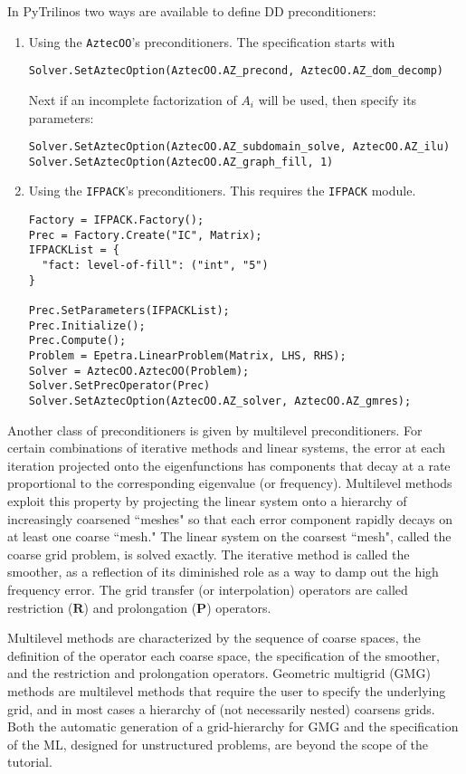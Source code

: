 \documentclass[10pt,relax]{SANDreport}
\begin{document}
In PyTrilinos two ways are available to define DD preconditioners:
\begin{enumerate}
\item Using the {\tt AztecOO}'s preconditioners. The specification starts with
\begin{verbatim}
Solver.SetAztecOption(AztecOO.AZ_precond, AztecOO.AZ_dom_decomp)
\end{verbatim}
Next if an incomplete factorization of $A_i$ will be used, then specify its parameters:
\begin{verbatim}
Solver.SetAztecOption(AztecOO.AZ_subdomain_solve, AztecOO.AZ_ilu)
Solver.SetAztecOption(AztecOO.AZ_graph_fill, 1)
\end{verbatim}

\item Using the {\tt IFPACK}'s preconditioners. This requires the {\tt IFPACK}
module.
\begin{verbatim}
Factory = IFPACK.Factory();
Prec = Factory.Create("IC", Matrix);
IFPACKList = {
  "fact: level-of-fill": ("int", "5")
}

Prec.SetParameters(IFPACKList);
Prec.Initialize();
Prec.Compute();
Problem = Epetra.LinearProblem(Matrix, LHS, RHS);
Solver = AztecOO.AztecOO(Problem);
Solver.SetPrecOperator(Prec)
Solver.SetAztecOption(AztecOO.AZ_solver, AztecOO.AZ_gmres);
\end{verbatim}
\end{enumerate}

\bigskip

Another class of preconditioners is given by multilevel preconditioners.
For certain combinations of iterative methods and linear systems, the
error at each iteration projected onto the eigenfunctions has components
that decay at a rate proportional to the corresponding eigenvalue (or
frequency).  Multilevel methods exploit this property \cite{Briggs2000}
by projecting the linear system onto a hierarchy of increasingly
coarsened ``meshes" so that each error component rapidly decays on at
least one coarse ``mesh."  The linear system on the coarsest ``mesh",
called the coarse grid problem, is solved exactly.  The iterative method
is called the smoother, as a reflection of its diminished role as a way
to damp out the high frequency error.  The grid transfer (or
interpolation) operators are called restriction ($\mathbf{R}$) and
prolongation ($\mathbf{P}$) operators.

Multilevel methods are characterized by the sequence of coarse spaces, the
definition of the operator each coarse space, the specification of the
smoother, and the restriction and prolongation operators.  Geometric multigrid
(GMG) methods  are multilevel methods that require the user to specify the
underlying grid, and in most cases a hierarchy of (not necessarily nested)
  coarsens grids.  Both the automatic generation of a grid-hierarchy for GMG
  and the specification of the ML, designed for unstructured problems, are
  beyond the scope of the tutorial.
\end{document}
